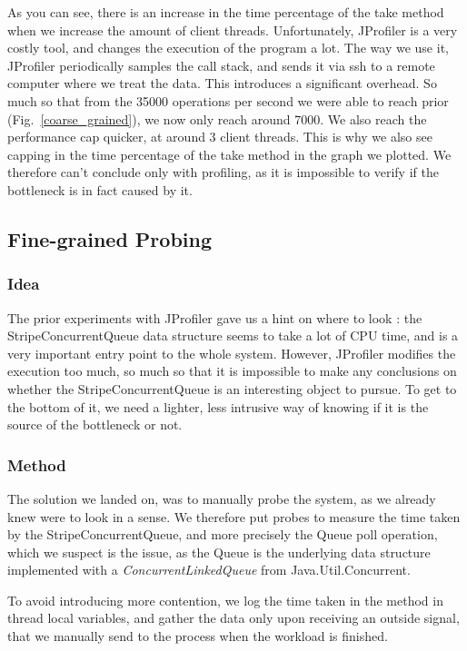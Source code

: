 \documentclass[conference]{IEEEtran}
\begin{document}
As you can see, there is an increase in the time percentage of the take method when we increase the amount of client threads. Unfortunately, JProfiler is a very costly tool, and changes the execution of the program a lot. The way we use it, JProfiler periodically samples the call stack, and sends it via ssh to a remote computer where we treat the data. This introduces a significant overhead. So much so that from the 35000 operations per second we were able to reach prior (Fig.~\ref{coarse_grained}), we now only reach around 7000. We also reach the performance cap quicker, at around 3 client threads. This is why we also see capping in the time percentage of the take method in the graph we plotted. We therefore can't conclude only with profiling, as it is impossible to verify if the bottleneck is in fact caused by it. 

\subsection{Fine-grained Probing}
\subsubsection{Idea}
The prior experiments with JProfiler gave us a hint on where to look : the StripeConcurrentQueue data structure seems to take a lot of CPU time, and is a very important entry point to the whole system. However, JProfiler modifies the execution too much, so much so that it is impossible to make any conclusions on whether the StripeConcurrentQueue is an interesting object to pursue. To get to the bottom of it, we need a lighter, less intrusive way of knowing if it is the source of the bottleneck or not.

\subsubsection{Method}
The solution we landed on, was to manually probe the system, as we already knew were to look in a sense. We therefore put probes to measure the time taken by the StripeConcurrentQueue, and more precisely the Queue poll operation, which we suspect is the issue, as the Queue is the underlying data structure implemented with a \textit{ConcurrentLinkedQueue} from Java.Util.Concurrent.

To avoid introducing more contention, we log the time taken in the method in thread local variables, and gather the data only upon receiving an outside signal, that we manually send to the process when the workload is finished.
\end{document}
